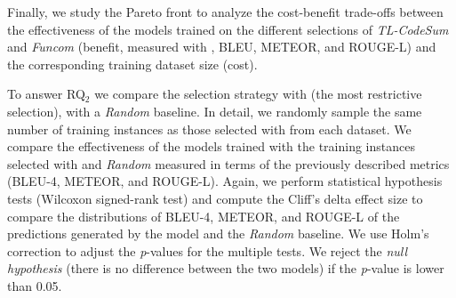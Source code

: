 Finally, we study the Pareto front to analyze the cost-benefit trade-offs between the effectiveness of the models trained on the different selections of \textit{TL-CodeSum} and \textit{Funcom} (benefit, measured with \ie, BLEU, METEOR, and ROUGE-L) and the corresponding training dataset size (cost).

To answer RQ$_{2}$ we compare the selection strategy with  (\ie the most restrictive selection), with a \textit{Random} baseline. In detail, we randomly sample the same number of training instances as those selected with  from each dataset. We compare the effectiveness of the models trained with the training instances selected with  and \textit{Random} measured in terms of the previously described metrics (\ie BLEU-4, METEOR, and ROUGE-L). Again, we perform statistical hypothesis tests (Wilcoxon signed-rank test) \cite{wilcoxon1992individual} and compute the Cliff's delta effect size \cite{grissom2005effect} to compare the distributions of BLEU-4, METEOR, and ROUGE-L of the predictions generated by the  model and the \textit{Random} baseline. We use Holm's correction \cite{holm1979simple} to adjust the \textit{p}-values for the multiple tests. We reject the \textit{null hypothesis} (there is no difference between the two models) if the \emph{p}-value is lower than 0.05.
